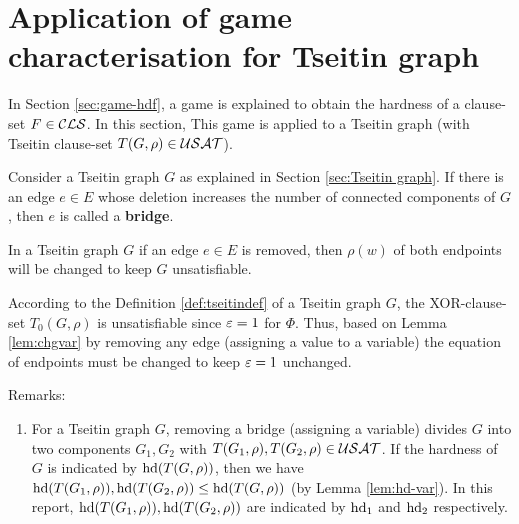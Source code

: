 \documentclass{report}
\begin{document}
\section{Application of game characterisation for Tseitin graph}
\label{sec:appgame}

In Section \ref{sec:game-hdf}, a game is explained to obtain the hardness of a clause-set $F \in \mathcal{CLS}$. In this section, This game is applied to a Tseitin graph (with Tseitin clause-set $T(G,\rho) \in \mathcal{USAT}$). %

 
\begin{defi}\label{def:bridge}
Consider a Tseitin graph $G$ as explained in Section \ref{sec:Tseitin graph}. If there is an edge $e \in E$ whose deletion increases the number of connected components of $G$, then $e$ is called a \textbf{bridge}.
\end{defi} 

\begin{lem}\label{lem:game3}
In a Tseitin graph $G$ if an edge $e \in E$ is removed, then $\rho(w)$ of both endpoints will be changed to keep $G$ unsatisfiable. 
\end{lem}
\begin{prf}
According to the Definition \ref{def:tseitindef} of a Tseitin graph $G$, the XOR-clause-set $T_0(G,\rho)$ is unsatisfiable since $\varepsilon=1$ for $\Phi$. Thus, based on Lemma \ref{lem:chgvar} by removing any edge (assigning a value to a variable) the equation of endpoints must be changed to keep $\varepsilon=1$ unchanged.
\end{prf}
Remarks:
  \begin{enumerate}
  \item For a Tseitin graph $G$, removing a bridge (assigning a variable) divides $G$ into two components $G_1,G_2 $ with $T(G_1,\rho), T(G_2,\rho) \in \mathcal{USAT}$. If the hardness of $G$ is indicated by $\operatorname{hd}(T(G,\rho))$, then we have $\operatorname{hd}(T(G_1,\rho)), \operatorname{hd}(T(G_2,\rho)) \le \operatorname{hd}(T(G,\rho)) $ (by Lemma \ref{lem:hd-var}). In this report,  $\operatorname{hd}(T(G_1,\rho)), \operatorname{hd}(T(G_2,\rho))$ are indicated by  $\operatorname{hd}_1$ and $\operatorname{hd}_2$ respectively.
\end{enumerate}
\end{document}
